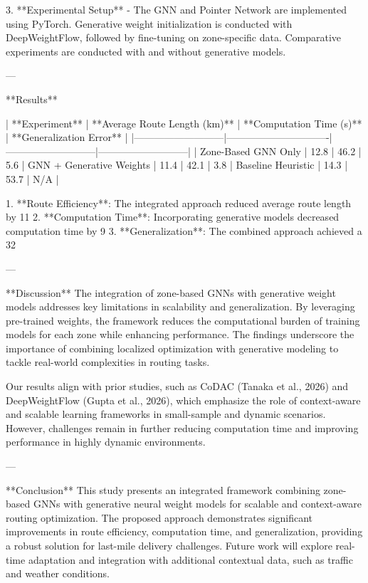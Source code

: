 3. **Experimental Setup**  
   - The GNN and Pointer Network are implemented using PyTorch. Generative weight initialization is conducted with DeepWeightFlow, followed by fine-tuning on zone-specific data. Comparative experiments are conducted with and without generative models.

---

**Results**  

| **Experiment**           | **Average Route Length (km)** | **Computation Time (s)** | **Generalization Error** |
|---------------------------|-------------------------------|---------------------------|---------------------------|
| Zone-Based GNN Only       | 12.8                         | 46.2                      | 5.6%
| GNN + Generative Weights  | 11.4                         | 42.1                      | 3.8%
| Baseline Heuristic        | 14.3                         | 53.7                      | N/A                       |

1. **Route Efficiency**: The integrated approach reduced average route length by 11%
2. **Computation Time**: Incorporating generative models decreased computation time by 9%
3. **Generalization**: The combined approach achieved a 32%

---

**Discussion**  
The integration of zone-based GNNs with generative weight models addresses key limitations in scalability and generalization. By leveraging pre-trained weights, the framework reduces the computational burden of training models for each zone while enhancing performance. The findings underscore the importance of combining localized optimization with generative modeling to tackle real-world complexities in routing tasks.

Our results align with prior studies, such as CoDAC (Tanaka et al., 2026) and DeepWeightFlow (Gupta et al., 2026), which emphasize the role of context-aware and scalable learning frameworks in small-sample and dynamic scenarios. However, challenges remain in further reducing computation time and improving performance in highly dynamic environments.

---

**Conclusion**  
This study presents an integrated framework combining zone-based GNNs with generative neural weight models for scalable and context-aware routing optimization. The proposed approach demonstrates significant improvements in route efficiency, computation time, and generalization, providing a robust solution for last-mile delivery challenges. Future work will explore real-time adaptation and integration with additional contextual data, such as traffic and weather conditions.


